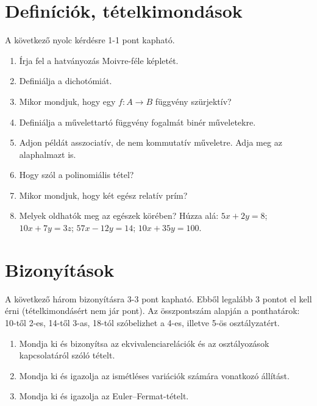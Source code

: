 \documentclass[11pt,a4paper]{article}
\begin{document}
\section{Definíciók, tételkimondások}
A következő nyolc kérdésre 1-1 pont kapható. 
\begin{enumerate}\setlength{\itemsep}{4.2cm}

\item Írja fel a hatványozás Moivre-féle képletét.
\item Definiálja a dichotómiát.
\item Mikor mondjuk, hogy egy $f\colon A\to B$ függvény szürjektív?
\item Definiálja a művelettartó függvény fogalmát binér műveletekre.

\newpage
\item Adjon példát asszociatív, de nem kommutatív műveletre. Adja meg az alaphalmazt is.
\item Hogy szól a polinomiális tétel?
\item Mikor mondjuk, hogy két egész relatív prím?
\item Melyek oldhatók meg az egészek körében? Húzza alá: $5x + 2y = 8$; $10x + 7y = 3z$; $57x - 12y = 14$; $10x + 35y =  100$.



\end{enumerate}

\newpage
\section{Bizonyítások}
A következő három bizonyításra 3-3 pont kapható. Ebből legalább 3 pontot el kell érni (tételkimondásért nem jár pont).
Az összpontszám alapján a ponthatárok: 10-től 2-es, 14-től 3-as, 18-tól szóbelizhet a 4-es, illetve 5-ös osztályzatért.
\begin{enumerate}

\item Mondja ki és bizonyítsa az ekvivalenciarelációk és az osztályozások kapcsolatáról szóló tételt.
\item Mondja ki és igazolja az ismétléses variációk számára vonatkozó állítást.
\item Mondja ki és igazolja az Euler--Fermat-tételt.

\end{enumerate}
\end{document}
